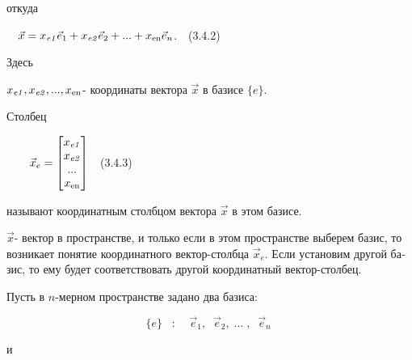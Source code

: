 \documentclass[a4paper]{article}
\newcommand\normalsubformula[1]{\text{\mathversion{normal}$#1$}}
\begin{document}
{\begin{russian}\sffamily
откуда
\end{russian}}

{\begin{russian}\sffamily
\ \  $\vec x=x_{\mathit{e1}}\vec e_1+x_{\mathit{e2}}\vec e_2+...+x_{\normalsubformula{\text{en}}}\vec e_n$.\ \ (3.4.2)
\end{russian}}

{\begin{russian}\sffamily
Здесь
\end{russian}}

{\begin{russian}\sffamily
 $x_{\mathit{e1}},x_{\mathit{e2}},...,x_{\normalsubformula{\text{en}}}$- координаты вектора  $\vec x$ в базисе  $\{e\}$.
\end{russian}}

{\begin{russian}\sffamily
Столбец 
\end{russian}}

{\begin{russian}\sffamily
\ \ \ \  $\vec
x_e=\left[\begin{matrix}x_{\mathit{e1}}\\x_{\mathit{e2}}\\...\\x_{\normalsubformula{\text{en}}}\end{matrix}\right]$\ \ (3.4.3)
\end{russian}}

{\begin{russian}\sffamily
называют координатным столбцом вектора  $\vec x$ в этом базисе. 
\end{russian}}

{\begin{russian}\sffamily
 $\vec x$- вектор в пространстве, и только если в этом пространстве выберем базис, то возникает понятие координатного
вектор-столбца  $\vec x_e$. Если установим другой базис, то ему будет соответствовать другой координатный
вектор-столбец.
\end{russian}}

{\begin{russian}\sffamily
Пусть в  $n$-мерном пространстве задано два базиса:
\end{russian}}

\begin{equation*}
\{e\}\;\;\;:\;\;\;\;\vec e_1,\;\;\vec e_2,\;...\;,\;\;\vec e_n\;
\end{equation*}
{\begin{russian}\sffamily
и
\end{russian}}
\end{document}
